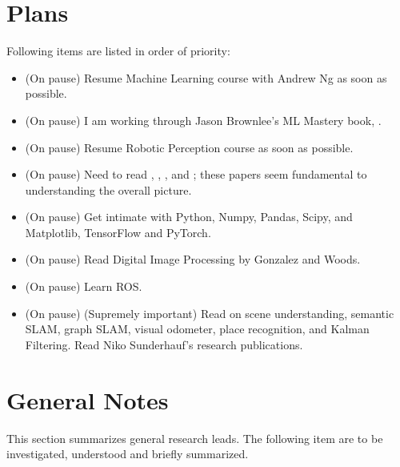\documentclass[11pt]{article}
\begin{document}
\section{Plans}
Following items are listed in order of priority: 

\begin{itemize} 
	
 \item (On pause) Resume Machine Learning course with Andrew Ng as soon as possible.  
 
 \item (On pause) I am working through Jason Brownlee's ML Mastery book, \cite{MLmasteryPy}.
 
 \item (On pause) Resume Robotic Perception course as soon as possible.

 \item (On pause) Need to read \cite{ImSRwDeepCNN}, \cite{MixDNNforSISR}, \cite{mModalSemanticSLAMwProb}, and \cite{RCANforImClass}; these papers seem fundamental to understanding the overall picture.

 \item (On pause) Get intimate with Python, Numpy, Pandas, Scipy, and Matplotlib, TensorFlow and PyTorch. 

 \item (On pause) Read Digital Image Processing by Gonzalez and Woods. 

 \item (On pause) Learn ROS.
 
 \item (On pause) (Supremely important) Read on scene understanding, semantic SLAM, graph SLAM, visual odometer, place recognition, and Kalman Filtering. Read Niko Sunderhauf's research publications. 
 
 \end{itemize}


\section{General Notes}
This section summarizes general research leads. The following item are to be investigated, understood and briefly summarized. 
\end{document}
